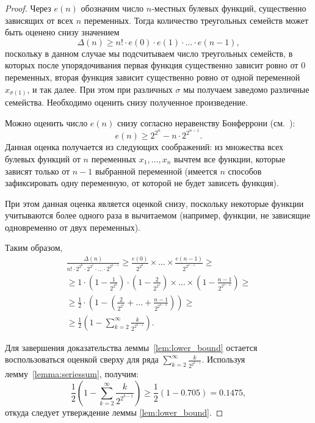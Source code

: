     \begin{proof}
        Через $e(n)$ обозначим число $n$-местных булевых функций, существенно зависящих от всех $n$ переменных.
        Тогда количество треугольных семейств может быть оценено снизу значением
        \[
            \Delta(n) \ge n! \cdot e(0) \cdot e(1) \cdot \ldots \cdot e(n-1),
        \]
        поскольку в данном случае мы подсчитываем число треугольных семейств, в которых после упорядочивания первая функция существенно зависит ровно от $0$ переменных, вторая функция зависит существенно ровно от одной переменной $x_{\sigma(1)}$, и так далее. 
        При этом при различных $\sigma$ мы получаем заведомо различные семейства. 
        Необходимо оценить снизу полученное произведение.

        Можно оценить число $e(n)$ снизу согласно неравенству Бонферрони (см.~\cite[раздел~1.3]{Zuev}):
        \[
            e(n) \ge 2^{2^n} - n \cdot 2^{2^{n-1}}.
        \]
        Данная оценка получается из следующих соображений: из множества всех булевых функций от $n$ переменных $x_1, \ldots, x_n$ вычтем все функции, которые зависят только от $n-1$ выбранной переменной (имеется $n$ способов зафиксировать одну переменную, от которой не будет зависеть функция).

        При этом данная оценка является оценкой снизу, поскольку некоторые функции учитываются более одного раза в вычитаемом (например, функции, не зависящие одновременно от двух переменных).

        Таким образом,
        \begin{multline*}
            \frac{\Delta(n)}{n! \cdot 2^{2^0} \cdot 2^{2^1} \cdot \ldots \cdot 2^{2^{n-1}}} \ge 
            \frac{e(0)}{2^{2^0}} \times \ldots \times \frac{e(n-1)}{2^{2^{n-1}}} \ge \\
            \ge 1 \cdot \left( 1 - \frac{1}{2^{2^0}} \right) \cdot 
            \left( 1 - \frac{2}{2^{2^1}} \right) \times 
            \ldots \times 
            \left( 1 - \frac{n-1}{2^{2^{n-2}}} \right) \ge \\
            \ge \frac{1}{2} \cdot \left( 1 - \left( \frac{2}{2^{2^1}} + \ldots + \frac{n-1}{2^{2^{n-2}}} \right) \right) \ge \\
            \ge \frac{1}{2} \left( 1 - \sum_{k=2}^{\infty} \frac{k}{2^{2^{k-1}}} \right).
        \end{multline*}

        Для завершения доказательства леммы~\ref{lem:lower_bound} остается воспользоваться оценкой сверху для ряда $\sum_{k=2}^{\infty} \frac{k}{2^{2^{k-1}}}$.
        Используя лемму~\ref{lemma:seriessum}, получим:
        \[
            \frac{1}{2} \left( 1 - \sum_{k=2}^{\infty} \frac{k}{2^{2^{k-1}}} \right) \ge \frac{1}{2}(1 - 0.705) = 0.1475,
        \]
        откуда следует утверждение леммы \ref{lem:lower_bound}.
    \end{proof}

